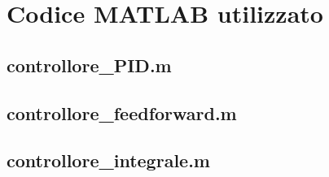 \section{Codice MATLAB utilizzato}
\label{app:MATLAB}
	
	\subsection{controllore\_PID.m}
	\label{subapp:controllorePID}
	
	
	\subsection{controllore\_feedforward.m}
	\label{subapp:controlloreFF}
	
	
	\subsection{controllore\_integrale.m}
	\label{subapp:controlloreIntegrale}
		
	
	